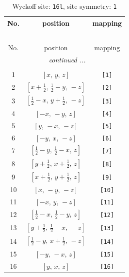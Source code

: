 \documentclass[fleqn,8pt]{jsarticle}
\begin{document}
\begin{longtable}{ccc}
\caption{Wyckoff site: {\tt 16l}, site symmetry: {\tt 1}}
 \\
 \hline \hline
No. & position & mapping \\ \hline \endfirsthead

\multicolumn{2}{l}{\tablename\ \thetable{}} \\
 \hline \hline
No. & position & mapping \\ \hline \endhead

 \hline \hline
\multicolumn{2}{r}{\footnotesize\it continued ...} \\ \endfoot

 \hline \hline
\multicolumn{2}{r}{} \\ \endlastfoot

1 & $\left[ x,\, y,\, z \right]$ & {\tt [1]} \\ \hline
2 & $\left[ x + \frac{1}{2},\, \frac{1}{2} - y,\, - z \right]$ & {\tt [2]} \\ \hline
3 & $\left[ \frac{1}{2} - x,\, y + \frac{1}{2},\, - z \right]$ & {\tt [3]} \\ \hline
4 & $\left[ - x,\, - y,\, z \right]$ & {\tt [4]} \\ \hline
5 & $\left[ y,\, - x,\, - z \right]$ & {\tt [5]} \\ \hline
6 & $\left[ - y,\, x,\, - z \right]$ & {\tt [6]} \\ \hline
7 & $\left[ \frac{1}{2} - y,\, \frac{1}{2} - x,\, z \right]$ & {\tt [7]} \\ \hline
8 & $\left[ y + \frac{1}{2},\, x + \frac{1}{2},\, z \right]$ & {\tt [8]} \\ \hline
9 & $\left[ x + \frac{1}{2},\, y + \frac{1}{2},\, z \right]$ & {\tt [9]} \\ \hline
10 & $\left[ x,\, - y,\, - z \right]$ & {\tt [10]} \\ \hline
11 & $\left[ - x,\, y,\, - z \right]$ & {\tt [11]} \\ \hline
12 & $\left[ \frac{1}{2} - x,\, \frac{1}{2} - y,\, z \right]$ & {\tt [12]} \\ \hline
13 & $\left[ y + \frac{1}{2},\, \frac{1}{2} - x,\, - z \right]$ & {\tt [13]} \\ \hline
14 & $\left[ \frac{1}{2} - y,\, x + \frac{1}{2},\, - z \right]$ & {\tt [14]} \\ \hline
15 & $\left[ - y,\, - x,\, z \right]$ & {\tt [15]} \\ \hline
16 & $\left[ y,\, x,\, z \right]$ & {\tt [16]} \\
\end{longtable}
\end{document}

